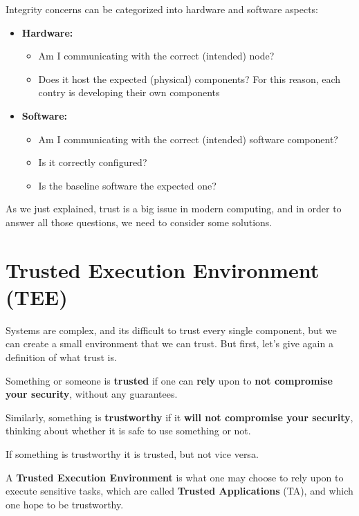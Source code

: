Integrity concerns can be categorized into hardware and 
software aspects:

\begin{itemize}
  \item \textbf{Hardware:}
    \begin{itemize}
      \item Am I communicating with the correct (intended) node?
      \item Does it host the expected (physical) components? For this
        reason, each contry is developing their own components
    \end{itemize}
  \item \textbf{Software:}
    \begin{itemize}
      \item Am I communicating with the correct (intended) 
        software component?
      \item Is it correctly configured?
      \item Is the baseline software the expected one?
    \end{itemize}
\end{itemize}

As we just explained, trust is a big issue in modern computing, and 
in order to answer all those questions, we need to consider some
solutions.
\section{Trusted Execution Environment (TEE)}
Systems are complex, and its difficult to trust every single
component, but we can create a small environment that we can trust.
But first, let's give again a definition of what trust is.
\begin{boxH}
  Something or someone is \textbf{trusted} if one can \textbf{rely}
  upon to \textbf{not compromise your security}, without any
  guarantees.
\end{boxH}

Similarly, something is \textbf{trustworthy} if it \textbf{will not
compromise your security}, thinking about whether it is safe to use
something or not.

If something is trustworthy it is trusted, but not vice versa.

\begin{boxH}
  A \textbf{Trusted Execution Environment} is what one may choose to
  rely upon to execute sensitive tasks, which are called
  \textbf{Trusted Applications} (TA), and which one hope to be
  trustworthy. 
\end{boxH}

